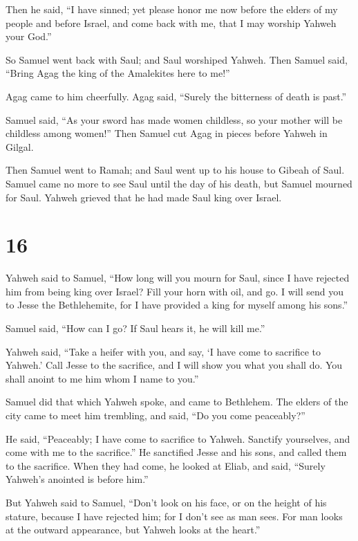  Then he said, ``I have sinned; yet please honor me now
before the elders of my people and before Israel, and come back with me,
that I may worship Yahweh your God.''

 So Samuel went back with Saul; and Saul worshiped
Yahweh.  Then Samuel said, ``Bring Agag the king of the
Amalekites here to me!''

Agag came to him cheerfully. Agag said, ``Surely the bitterness of death
is past.''

 Samuel said, ``As your sword has made women childless,
so your mother will be childless among women!'' Then Samuel cut Agag in
pieces before Yahweh in Gilgal.

 Then Samuel went to Ramah; and Saul went up to his house
to Gibeah of Saul.  Samuel came no more to see Saul until
the day of his death, but Samuel mourned for Saul. Yahweh grieved that
he had made Saul king over Israel.

\hypertarget{section-15}{%
\section{16}\label{section-15}}

 Yahweh said to Samuel, ``How long will you mourn for
Saul, since I have rejected him from being king over Israel? Fill your
horn with oil, and go. I will send you to Jesse the Bethlehemite, for I
have provided a king for myself among his sons.''

 Samuel said, ``How can I go? If Saul hears it, he will
kill me.''

Yahweh said, ``Take a heifer with you, and say, `I have come to
sacrifice to Yahweh.'  Call Jesse to the sacrifice, and I
will show you what you shall do. You shall anoint to me him whom I name
to you.''

 Samuel did that which Yahweh spoke, and came to
Bethlehem. The elders of the city came to meet him trembling, and said,
``Do you come peaceably?''

 He said, ``Peaceably; I have come to sacrifice to Yahweh.
Sanctify yourselves, and come with me to the sacrifice.'' He sanctified
Jesse and his sons, and called them to the sacrifice. 
When they had come, he looked at Eliab, and said, ``Surely Yahweh's
anointed is before him.''

 But Yahweh said to Samuel, ``Don't look on his face, or
on the height of his stature, because I have rejected him; for I don't
see as man sees. For man looks at the outward appearance, but Yahweh
looks at the heart.''

